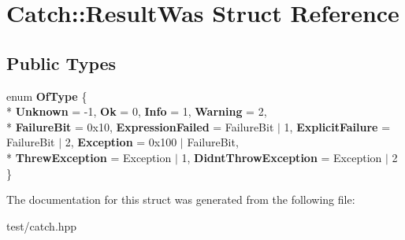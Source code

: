 \hypertarget{structCatch_1_1ResultWas}{}\section{Catch\+:\+:Result\+Was Struct Reference}
\label{structCatch_1_1ResultWas}
\subsection*{Public Types}
\begin{DoxyCompactItemize}
\item 
enum {\bfseries Of\+Type} \{ \\*
{\bfseries Unknown} = -\/1, 
{\bfseries Ok} = 0, 
{\bfseries Info} = 1, 
{\bfseries Warning} = 2, 
\\*
{\bfseries Failure\+Bit} = 0x10, 
{\bfseries Expression\+Failed} = Failure\+Bit $\vert$ 1, 
{\bfseries Explicit\+Failure} = Failure\+Bit $\vert$ 2, 
{\bfseries Exception} = 0x100 $\vert$ Failure\+Bit, 
\\*
{\bfseries Threw\+Exception} = Exception $\vert$ 1, 
{\bfseries Didnt\+Throw\+Exception} = Exception $\vert$ 2
 \}\hypertarget{structCatch_1_1ResultWas_a624e1ee3661fcf6094ceef1f654601ef}{}\label{structCatch_1_1ResultWas_a624e1ee3661fcf6094ceef1f654601ef}

\end{DoxyCompactItemize}


The documentation for this struct was generated from the following file\+:\begin{DoxyCompactItemize}
\item 
test/catch.\+hpp\end{DoxyCompactItemize}

